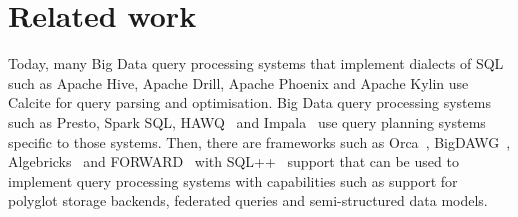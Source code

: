 \section{Related work}
\label{sec:related}


Today, many Big Data query processing systems that implement dialects of SQL such as Apache Hive, Apache Drill, Apache Phoenix and Apache Kylin use Calcite for query parsing and optimisation. Big Data query processing systems such as Presto, Spark SQL, HAWQ~\cite{chang2014hawq} and Impala~\cite{kornacker2015impala} use query planning systems specific to those systems. Then,  there are frameworks such as Orca~\cite{Soliman:2014:OMQ:2588555.2595637}, BigDAWG~\cite{duggan2015bigdawg}, Algebricks~\cite{borkar2015algebricks} and FORWARD~\cite{fu2011sql} with SQL++~\cite{ong2014sql++} support that can be used to implement query processing systems with capabilities such as support for polyglot storage backends, federated queries and semi-structured data models.

